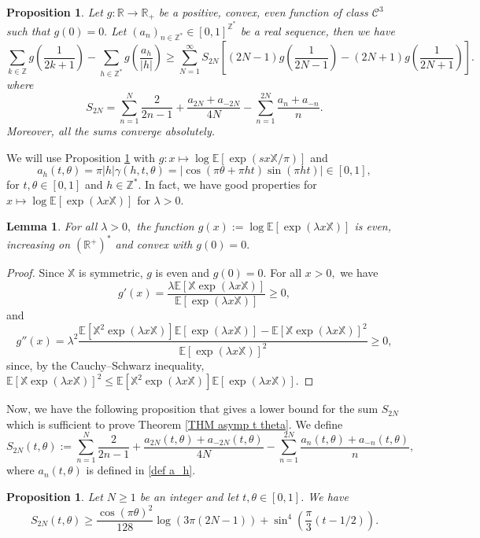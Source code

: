\documentclass[12pt]{amsart}
\newtheorem{lem}[thm]{Lemma}
\newtheorem{pro}[thm]{Proposition}
\theoremstyle{definition}
\numberwithin{equation}{section}
\numberwithin{equation}{section}
\def\E{\mathbb{E}}
\def\Ccal{\mathcal{C}}
\def\R{\mathbb{R}}
\def\Z{\mathbb{Z}}
\def\X{\mathbb{X}}
\def\E{\mathbb{E}}
\begin{document}
\begin{pro}\label{pro conv methode} 
Let $g:\R\to \R_+$ be a positive, convex, even function of class $\Ccal^3 $ such that $g(0)=0.$
Let $(a_n)_{n\in\Z^*}\in [0,1]^{\Z^*}$ be a real sequence, then we have
\[
\sum_{k\in\Z} g\left(\frac{1}{2k+1}\right)-
\sum_{h\in\Z^*} g\left(\frac{a_h}{|h|}\right)
\geq 
\sum_{N = 1}^{\infty} S_{2N} \left[
(2N-1)g\left(\frac{1}{2N-1}\right)
-(2N+1)g\left(\frac{1}{2N+1}\right)\right].
\]
where
\[
S_{2N} = \sum_{n=1}^N 
\frac{2}{2n-1} +\frac{a_{2N}+a_{-2N}}{4N} -
\sum_{n=1}^{2N} 
\frac{a_{n}+a_{-n}}{n}.
\]
Moreover, all the sums converge absolutely.
\end{pro}
We will use Proposition \ref{pro conv methode} with $g: x\mapsto \log \E[\exp(sx\X/\pi)]$ and
\begin{equation}\label{def a_h}
a_{h}(t, \theta) = \pi|h|\gamma(h,t,\theta) = |\cos(\pi \theta+\pi ht)\sin(\pi h t)|\in[0,1],
\end{equation}
for $t, \theta\in[0,1]$ and $h \in \Z^*$.
In fact, we have good properties for $x\mapsto \log \E[\exp(\lambda x\X)]$ for $\lambda>0 $.
\begin{lem}\label{lem log E exp convexe} For all $\lambda>0,$ the function $g (x):= \log \E[\exp(\lambda x\X)]$ is even, increasing on $(\R^+)^*$ and convex with $g(0) = 0.$
\end{lem}
\begin{proof} Since $\X$ is symmetric, $g$ is even and $g(0) =0.$
For all $x>0,$ we have
\[
g'(x) = \frac{\lambda\E[\X\exp(\lambda x\X)]}{\E[\exp(\lambda x\X)]}\geq 0,
\]
and
\[
g''(x) = \lambda^2\frac{\E[\X^2\exp(\lambda x\X)]\E[\exp(\lambda x\X)]-\E[\X\exp(\lambda x\X)]^2}{\E[\exp(\lambda x\X)]^2}\geq 0,\]
since, by the Cauchy--Schwarz inequality,
$
\E[\X\exp(\lambda x\X)]^2
\leq
\E[\X^2\exp(\lambda x\X)]
\E[\exp(\lambda x\X)].$
\end{proof}
Now, we have the following proposition that gives a lower bound for the sum $S_{2N}$ which is sufficient to prove Theorem \ref{THM asymp t theta}. We define
\begin{equation}\label{def S 2N}
    S_{2N}(t,\theta) := \sum_{n=1}^N 
\frac{2}{2n-1}+\frac{a_{2N}(t,\theta)+a_{-2N}(t,\theta)}{4N} -
\sum_{n=1}^{2N} 
\frac{a_n(t,\theta)+a_{-n}(t,\theta)}{n},
\end{equation}
where $a_n(t,\theta)$ is defined in \eqref{def a_h}.

\begin{pro}\label{thm S_2N > marge (t,theta)}
Let \(N\geq1\) be an integer and let \(t,\theta\in[0,1]\). We have
\[
    S_{2N}(t,\theta)
    \geq  
    \frac{\cos(\pi\theta)^2}{128}\log(3\pi(2N-1))
    +\sin^4\left(\frac{\pi}{3}(t-1/2)\right).
    \]
\end{pro}
\end{document}

